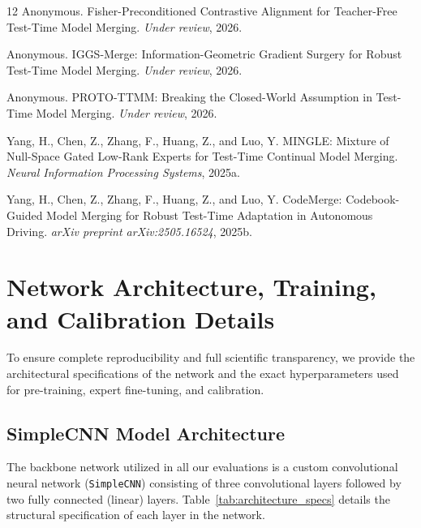\documentclass{article}
\theoremstyle{plain}
\theoremstyle{definition}
\theoremstyle{remark}
\begin{document}
\begin{thebibliography}{12}
Anonymous.
\newblock Fisher-Preconditioned Contrastive Alignment for Teacher-Free Test-Time Model Merging.
\newblock \emph{Under review}, 2026{}.

Anonymous.
\newblock IGGS-Merge: Information-Geometric Gradient Surgery for Robust Test-Time Model Merging.
\newblock \emph{Under review}, 2026{}.

Anonymous.
\newblock PROTO-TTMM: Breaking the Closed-World Assumption in Test-Time Model Merging.
\newblock \emph{Under review}, 2026{}.

Yang, H., Chen, Z., Zhang, F., Huang, Z., and Luo, Y.
\newblock MINGLE: Mixture of Null-Space Gated Low-Rank Experts for Test-Time Continual Model Merging.
\newblock \emph{Neural Information Processing Systems}, 2025a.

Yang, H., Chen, Z., Zhang, F., Huang, Z., and Luo, Y.
\newblock CodeMerge: Codebook-Guided Model Merging for Robust Test-Time Adaptation in Autonomous Driving.
\newblock \emph{arXiv preprint arXiv:2505.16524}, 2025b.

\end{thebibliography}

\newpage
\appendix
\onecolumn

\section{Network Architecture, Training, and Calibration Details}
\label{app:arch_details}
To ensure complete reproducibility and full scientific transparency, we provide the architectural specifications of the network and the exact hyperparameters used for pre-training, expert fine-tuning, and calibration.

\subsection{SimpleCNN Model Architecture}
The backbone network utilized in all our evaluations is a custom convolutional neural network (\texttt{SimpleCNN}) consisting of three convolutional layers followed by two fully connected (linear) layers. Table~\ref{tab:architecture_specs} details the structural specification of each layer in the network.
\end{document}
